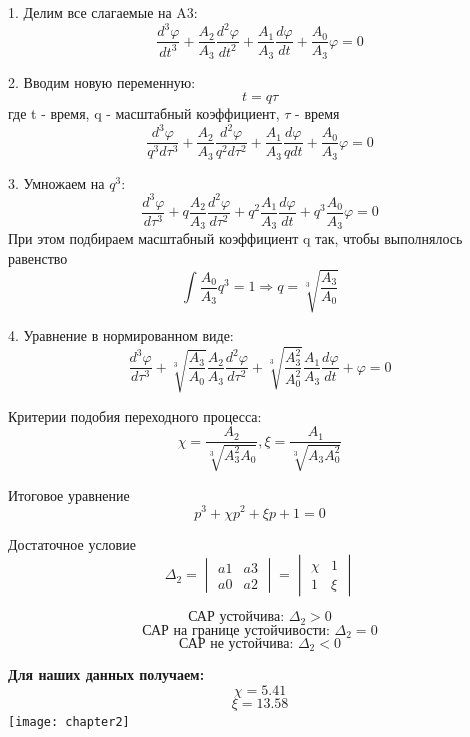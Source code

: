 \documentclass[12pt, a4paper]{report}
\def\cc{13.58}
\def\xx{5.41}
\begin{document}
1. Делим все слагаемые на A3:
$$ \frac{d^{3}\varphi}{dt^{3}} + \frac{A_{2}}{A_{3}}\frac{d^{2}\varphi}{dt^{2}} + \frac{A_{1}}{A_{3}}\frac{d\varphi}{dt} + \frac{A_{0}}{A_{3}}\varphi = 0 $$

2. Вводим новую переменную:
$$ t = q\tau $$ где t - время, q - масштабный коэффициент, $\tau$ - время
$$ \frac{d^{3}\varphi}{q^{3}d\tau^{3}} + \frac{A_{2}}{A_{3}}\frac{d^{2}\varphi}{q^{2}d\tau^{2}} + \frac{A_{1}}{A_{3}}\frac{d\varphi}{qdt} + \frac{A_{0}}{A_{3}}\varphi = 0 $$

3. Умножаем на $ q^3 $:
$$ \frac{d^{3}\varphi}{d\tau^{3}} + q\frac{A_{2}}{A_{3}}\frac{d^{2}\varphi}{d\tau^{2}} + q^{2}\frac{A_{1}}{A_{3}}\frac{d\varphi}{dt} + q^{3}\frac{A_{0}}{A_{3}}\varphi = 0 $$
При этом подбираем масштабный коэффициент q так, чтобы выполнялось равенство $$ \int{ \frac{A_{0}}{A_{3}}q^{3} } = 1 \Rightarrow q = \sqrt[3]{\frac{A_{3}}{A_{0}}} $$


4. Уравнение в нормированном виде:
$$ \frac{d^{3}\varphi}{d\tau^{3}} +
        \sqrt[3]{\frac{A_{3}}{A_{0}}}\frac{A_{2}}{A_{3}}\frac{d^{2}\varphi}{d\tau^{2}} +
        \sqrt[3]{\frac{A_{3}^{2}}{A_{0}^{2}}}\frac{A_{1}}{A_{3}}\frac{d\varphi}{dt} +
        \varphi = 0 $$

Критерии подобия переходного процесса: $$ \chi = \frac{A_{2}}{\sqrt[3]{A_{3}^2A_{0}}}, \xi = \frac{A_{1}}{\sqrt[3]{A_{3}A_{0}^2}} $$

Итоговое уравнение $$ p^{3} + \chi p^{2} + \xi p + 1 = 0 $$

Достаточное условие $$ \Delta_{2} = \begin{vmatrix}
                                         a1 &a3 \\
                                         a0 &a2
                                         \end{vmatrix} =
                                         \begin{vmatrix}
                                         \chi &1 \\
                                         1    &\xi
                                         \end{vmatrix} $$

$$ \text{САР устойчива: } \Delta_{2} > 0 $$
$$ \text{САР на границе устойчивости: } \Delta_{2} = 0 $$
$$ \text{САР не устойчива: } \Delta_{2} < 0 $$

\newpage

\textbf{Для наших данных получаем:}
$$ \chi = \xx $$
$$ \xi = \cc $$
\texttt{[image: chapter2]}
\end{document}
